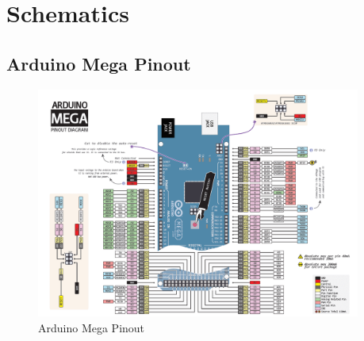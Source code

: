 \pagebreak
\section{Schematics}
\subsection{Arduino Mega Pinout} 
\label{megaPinout}
\vspace{-2cm}
\begin{figure}[H]
	\centering
\includegraphics[angle=90,origin=c,width=0.95\textwidth]{figures/megaPinout.png}
	\caption{Arduino Mega Pinout \cite{Atmega}}
	\label{megaPinoutPic}
\end{figure}
